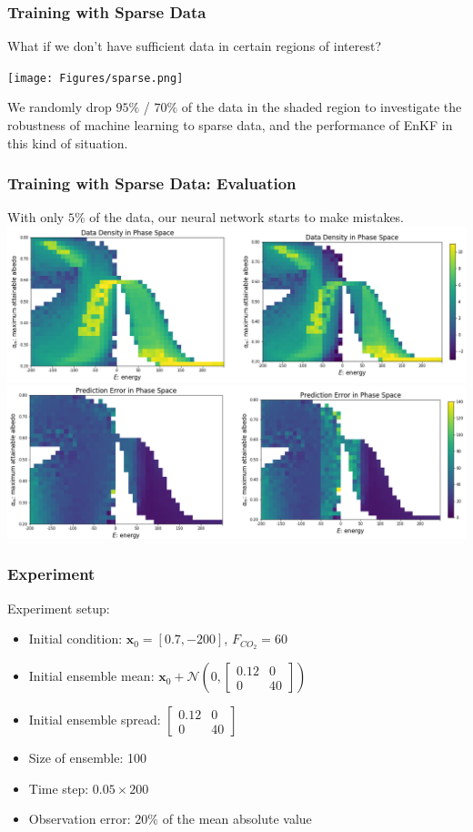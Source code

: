 \documentclass{beamer}
\newcommand{\mx}{\textbf{x}}
\newcommand{\cN}{\mathcal{N}}
\begin{document}
\begin{frame}
\frametitle{Training with Sparse Data}
\small{What if we don't have sufficient data in certain regions of interest?}\par
\begin{center}
\texttt{[image: Figures/sparse.png]}
\end{center}
\small{We randomly drop $95\%$ / $70\%$ of the data in the shaded region to investigate the robustness of machine learning to sparse data, and the performance of EnKF in this kind of situation.}
\end{frame}

\begin{frame}
\frametitle{Training with Sparse Data: Evaluation}
With only $5\%$ of the data, our neural network starts to make mistakes.
\centering
\includegraphics[width=0.8\linewidth]{Figures/DensityMatrix_sparse_comparison.png}
\centering
\includegraphics[width=0.8\linewidth]{Figures/ErrorMatrix_sparse_comparison.png}
\end{frame}

\begin{frame}
\frametitle{Experiment}
Experiment setup:
\begin{itemize}
	\item Initial condition: $\mx_0=[0.7,-200]$, $F_{CO_2}=60$
	\item Initial ensemble mean: $\mx_0+\cN(0,\begin{bmatrix}
	0.12 & 0 \\
	0 & 40
	\end{bmatrix})$
	\item Initial ensemble spread: $\begin{bmatrix}
	0.12 & 0 \\
	0 & 40
	\end{bmatrix}$
	\item Size of ensemble: 100
	\item Time step: $0.05 \times 200$
	\item Observation error: $20\%$ of the mean absolute value
\end{itemize}
\end{frame}
\end{document}
